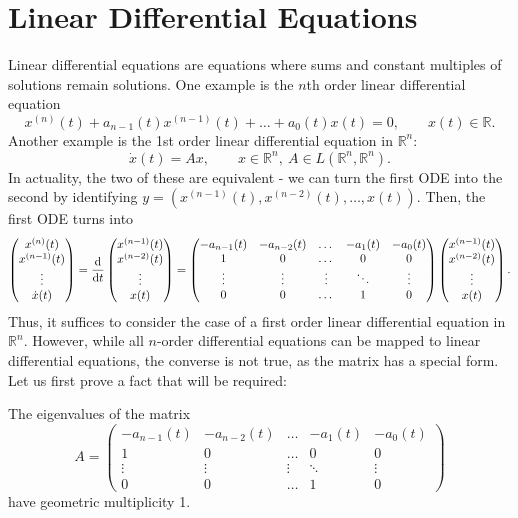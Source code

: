 \documentclass[prb,12pt]{revtex4-2}
\theoremstyle{definition}
\theoremstyle{definition}
\theoremstyle{definition}
\newcommand{\R}{\mathbb{R}}
\begin{document}
\section{Linear Differential Equations}
Linear differential equations are equations where sums and constant multiples of solutions remain solutions. One example is the $n$th order linear differential equation
\[
x^{(n)}(t) + a_{n-1}(t) x^{(n-1)}(t) + \dots + a_{0}(t)x(t)=0,\qquad x(t) \in \R
.\] 
Another example is the 1st order linear differential equation in $\R^n$:
\[
\dot{x}(t)= Ax,\qquad x\in \R^n,~A\in L(\R^n, \R^n)
.\] 
In actuality, the two of these are equivalent - we can turn the first ODE into the second by identifying $y=(x^{(n-1)}(t), x^{(n-2)}(t), \dots, x(t))$. Then, the first ODE turns into
\[
\begin{pmatrix} x^{(n)}(t) \\ x^{(n-1)}(t) \\ \vdots \\ \dot{x}(t) \end{pmatrix}= \dv{t}\begin{pmatrix} x^{(n-1)}(t) \\ x^{(n-2)}(t) \\ \vdots \\ x(t) \end{pmatrix}= \begin{pmatrix} -a_{n-1}(t) & -a_{n-2}(t) & \dots& -a_{1}(t) &  -a_{0}(t) \\ 1 & 0 & \dots & 0 & 0 \\ \vdots & \vdots & \vdots & \ddots & \vdots \\ 0 & 0 & \dots & 1 & 0\end{pmatrix}  \begin{pmatrix} x^{(n-1)}(t) \\ x^{(n-2)}(t) \\ \vdots \\ x(t) \end{pmatrix} 
.\] 
Thus, it suffices to consider the case of a first order linear differential equation in $\R^n$. However, while all $n$-order differential equations can be mapped to linear differential equations, the converse is not true, as the matrix has a special form. Let us first prove a fact that will be required:
\begin{Proposition}
	The eigenvalues of the matrix
	\[
	A = \begin{pmatrix} -a_{n-1}(t) & -a_{n-2}(t) & \dots& -a_{1}(t) &  -a_{0}(t) \\ 1 & 0 & \dots & 0 & 0 \\ \vdots & \vdots & \vdots & \ddots & \vdots \\ 0 & 0 & \dots & 1 & 0\end{pmatrix} 
	\] 
	have geometric multiplicity 1.
\end{Proposition}
\end{document}
